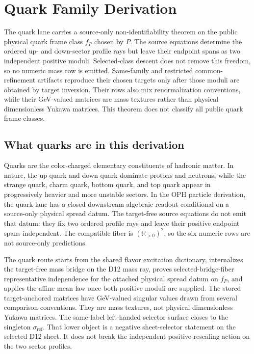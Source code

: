 \documentclass[11pt]{article}
\begin{document}
\section{Quark Family Derivation}

The quark lane carries a source-only non-identifiability theorem on the public physical quark frame
class \(f_P\) chosen by \(P\). The source equations determine the ordered up- and down-sector
profile rays but leave their endpoint spans as two independent positive moduli. Selected-class
descent does not remove this freedom, so no numeric mass row is emitted. Same-family and restricted
common-refinement artifacts reproduce their chosen targets only after those moduli are obtained by
target inversion. Their rows also mix renormalization conventions, while their GeV-valued matrices
are mass textures rather than physical dimensionless Yukawa matrices. This theorem does not classify
all public quark frame classes.

\subsection{What quarks are in this derivation}

Quarks are the color-charged elementary constituents of hadronic matter. In nature, the up quark
and down quark dominate protons and neutrons, while the strange quark, charm quark, bottom
quark, and top quark appear in progressively heavier and more unstable sectors. In the OPH
particle derivation, the quark lane has a closed downstream algebraic readout conditional on a
source-only physical spread datum. The target-free source equations do not emit that datum: they
fix two ordered profile rays and leave their positive endpoint spans independent. The compatible
fiber is \((\mathbb R_{>0})^2\), so the six numeric rows are not source-only predictions.

The quark route starts from the shared flavor excitation dictionary, internalizes the target-free
mass bridge on the D12 mass ray, proves selected-bridge-fiber representative independence for the
attached physical spread datum on \(f_P\), and applies the affine mean law once both positive
moduli are supplied. The stored target-anchored matrices have GeV-valued singular values drawn
from several comparison conventions. They are mass textures, not physical dimensionless Yukawa
matrices.
The same-label left-handed selector surface closes to the singleton
\(\sigma_{\mathrm{ref}}\). That lower object is a negative sheet-selector statement
on the selected D12 sheet. It does not break the independent positive-rescaling action on the two
sector profiles.
\end{document}
